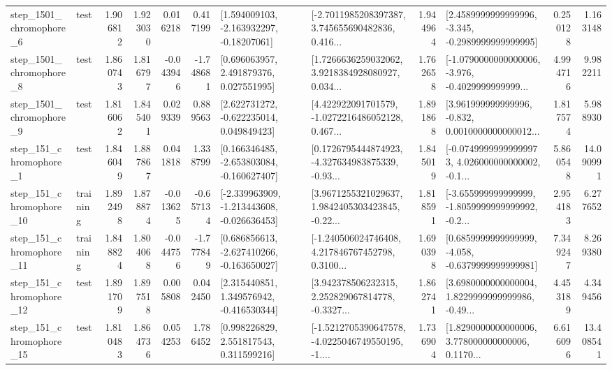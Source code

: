 \begin{tabular}{llrrrrllrlrr}
  step\_1501\_chromophore\_6 &      test &      1.906812 &    1.923030 &      0.016218 &  0.417199 &    [1.594009103, -2.163932297, -0.18207061] &  [-2.7011985208397387, 3.745655690482836, 0.416... &       1.944964 &  [2.4589999999999996, -3.345, -0.2989999999999995] &            0.250128 &          1.163148 \\
  step\_1501\_chromophore\_8 &      test &      1.860743 &    1.816797 &     -0.043946 & -1.748681 &     [0.696063957, 2.491879376, 0.027551995] &  [1.7266636259032062, 3.9218384928080927, 0.034... &       1.762658 &  [-1.0790000000000006, -3.976, -0.4029999999999... &            4.994716 &          9.982211 \\
  step\_1501\_chromophore\_9 &      test &      1.816062 &    1.845401 &      0.029339 &  0.889563 &    [2.622731272, -0.622235014, 0.049849423] &  [4.422922091701579, -1.0272216486052128, 0.467... &       1.891868 &  [3.961999999999996, -0.832, 0.0010000000000012... &            1.817574 &          5.988930 \\
   step\_151\_chromophore\_1 &      test &      1.846049 &    1.887867 &      0.041818 &  1.338799 &   [0.166346485, -2.653803084, -0.160627407] &  [0.1726795444874923, -4.327634983875339, -0.93... &       1.845019 &  [-0.07499999999999973, 4.026000000000002, -0.1... &            5.860548 &         14.090991 \\
  step\_151\_chromophore\_10 &  training &      1.892498 &    1.878874 &     -0.013625 & -0.657134 &  [-2.339963909, -1.213443608, -0.026636453] &  [3.9671255321029637, 1.9842405303423845, -0.22... &       1.818591 &  [-3.655999999999999, -1.8059999999999992, -0.2... &            2.954183 &          6.277652 \\
  step\_151\_chromophore\_11 &  training &      1.848824 &    1.804068 &     -0.044756 & -1.777849 &   [0.686856613, -2.627410266, -0.163650027] &  [-1.240506024746408, 4.217846767452798, 0.3100... &       1.690398 &  [0.6859999999999999, -4.058, -0.6379999999999981] &            7.349247 &          8.269380 \\
  step\_151\_chromophore\_12 &      test &      1.891709 &    1.897518 &      0.005808 &  0.042450 &    [2.315440851, 1.349576942, -0.416530344] &  [3.942378506232315, 2.252829067814778, -0.3327... &       1.862741 &  [3.6980000000000004, 1.8229999999999986, -0.49... &            4.453189 &          4.349456 \\
  step\_151\_chromophore\_15 &      test &      1.810483 &    1.864736 &      0.054253 &  1.786452 &     [0.998226829, 2.551817543, 0.311599216] &  [-1.5212705390647578, -4.0225046749550195, -1.... &       1.736904 &  [1.8290000000000006, 3.778000000000006, 0.1170... &            6.616096 &         13.408541 \\

\end{tabular}
